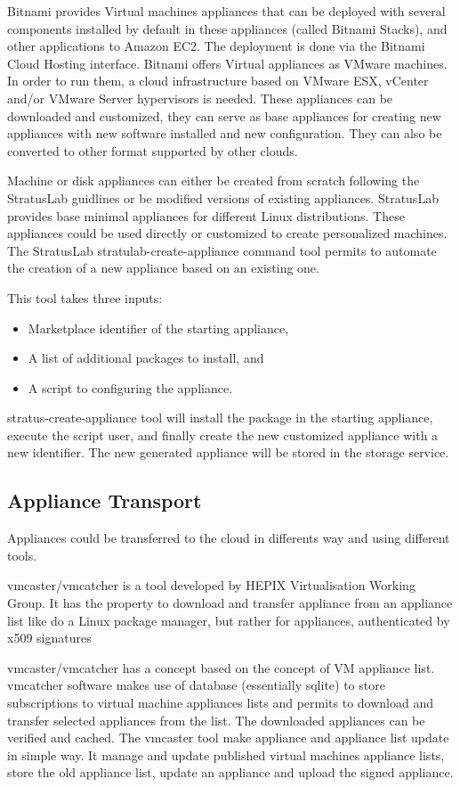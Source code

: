Bitnami provides Virtual machines appliances that can be deployed with several components installed by default in these appliances (called Bitnami Stacks), and other applications to Amazon EC2. The deployment is done via the Bitnami Cloud Hosting interface. Bitnami offers Virtual appliances as VMware machines. In order to run them, a cloud infrastructure based on VMware ESX, vCenter and/or VMware Server hypervisors is needed. These appliances can be downloaded and customized,  they can serve as base appliances for creating new appliances with new software installed and new configuration. They can also be converted to other format supported by other clouds.

Machine or disk appliances can either be created from scratch following the StratusLab guidlines or be modified versions of existing appliances. 
StratusLab provides base minimal appliances for different Linux distributions. These appliances could be used directly or customized to create personalized machines.
The StratusLab stratulab-create-appliance command tool permits to automate the creation of a new appliance based on an existing one.
 
This tool takes three inputs:
\begin{itemize}
\item Marketplace identifier of the starting appliance,
\item A list of additional packages to install, and
\item A script to configuring the appliance.
\end{itemize}
stratus-create-appliance tool will install the package in the starting appliance, execute the script user, and finally create the new customized appliance with a new identifier.
The new generated appliance will be stored in the storage service.

\subsection{Appliance Transport}
Appliances could be transferred to the cloud in differents way and using different tools.

vmcaster/vmcatcher is a tool developed by HEPIX Virtualisation Working Group. It has the property to download and transfer appliance from an appliance list like do a Linux package manager, but rather for appliances, authenticated by x509 signatures

vmcaster/vmcatcher has a concept based on the concept of VM appliance list.
vmcatcher software makes use of database (essentially sqlite) to store subscriptions to virtual machine appliances lists and permits to download and transfer selected appliances from the list. The downloaded appliances can be verified and cached. 
The vmcaster tool make appliance and appliance list update in simple way. It manage and update published virtual machines appliance lists, store the old appliance list, update an appliance and upload the signed appliance.

